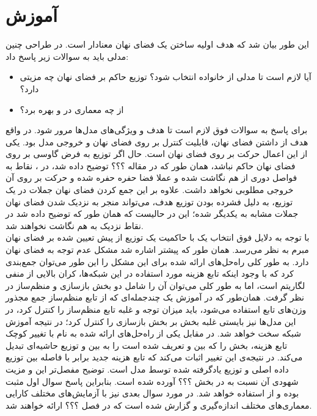 \section{آموزش \autoencoder{}}
این طور بیان شد که هدف اولیه ساختن یک فضای نهان معنادار است. در طراحی چنین مدلی باید به سوالات زیر پاسخ داد:
\begin{itemize}
    \item
    آیا لازم است تا مدلی از خانواده \vae{}  انتخاب شود؟ توزیع حاکم بر فضای نهان چه مزیتی دارد؟
    \item 
    از چه معماری در \encoder{} و \decoder{} بهره برد؟
\end{itemize}
برای پاسخ به سوالات فوق لازم است تا هدف و ویژگی‌های مدل‌ها مرور شود. در واقع هدف از داشتن فضای نهان، قابلیت کنترل بر روی فضای نهان و خروجی مدل بود. یکی از این اعمال حرکت بر روی فضای نهان است. حال اگر توزیع به فرض گاوسی بر روی فضای نهان حاکم نباشد، همان طور که در مقاله ؟؟؟ توضیح داده شد، در \autoencoder{}، نقاط به فواصل دوری از هم نگاشت شده و عملا فضا حفره حفره شده و حرکت بر روی آن خروجی مطلوبی نخواهد داشت. علاوه بر این جمع کردن فضای نهان جملات در یک توزیع، به دلیل فشرده بودن توزیع هدف، می‌تواند منجر به نزدیک شدن فضای نهان جملات مشابه به یکدیگر شده؛ این در حالیست که همان طور که توضیح داده شد در   \autoencoder{} نقاط نزدیک به هم نگاشت نخواهند شد.
\\
با توجه به دلایل فوق انتخاب یک \autoencoder{} با حاکمیت یک توزیع از پیش تعیین شده بر فضای نهان مبرم به نظر می‌رسد. همان طور که پیشتر اشاره شد \vae{} مشکل عدم توجه به فضای نهان دارد. به طور کلی راه‌حل‌های ارائه شده برای این مشکل را این طور  می‌توان جمع‌بندی کرد که با وجود اینکه تابع هزینه مورد استفاده در این شبکه‌ها، کران بالایی از منفی لگاریتم \likelihood است، اما به طور کلی می‌توان آن را شامل دو بخش بازسازی و منظم‌ساز در نظر گرفت. همان‌طور که در آموزش یک چندجمله‌ای که از تابع منظم‌ساز جمع مجذور وزن‌های تابع استفاده می‌شود، باید میزان توجه و غلبه تابع منظم‌ساز را کنترل کرد، در این مدل‌ها نیز بایستی غلبه بخش  بر بخش بازسازی را کنترل کرد؛ در نتیجه آموزش شبکه سخت خواهد شد. در مقابل یکی از راه‌حل‌های ارائه شده به نام \wae{} با تغییر کوچک تابع هزینه، بخش  را که بین \priordist{} و \posteriordist{} تعریف شده است را به  بین \priordist{} و توزیع حاشیه‌ای \posterior{} تبدیل می‌کند. در نتیجه‌ی این تغییر اثبات می‌کند که تابع هزینه جدید برابر با فاصله \wasser{} بین توزیع داده اصلی و توزیع یادگرفته شده توسط مدل است. توضیح مفصل‌تر این \autoencoder{} و مزیت شهودی آن نسبت به \vae{} در بخش ؟؟؟ آورده شده است. بنابراین پاسخ سوال اول مثبت بوده و از \wae{} استفاده خواهد شد.
در مورد سوال بعدی نیز با آزمایش‌های مختلف کارایی معماری‌های مختلف اندازه‌گیری و گزارش شده است که در فصل ؟؟؟ ارائه خواهند شد.
